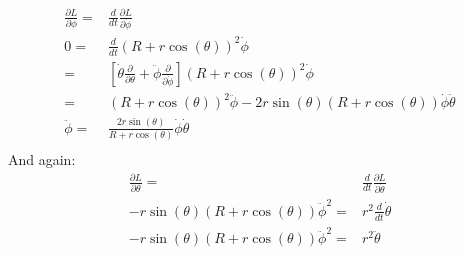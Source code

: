 \begin{equation*}
\begin{aligned}
	\frac{\partial L}{\partial \phi} =& \frac{d}{d t}\frac{\partial L}{\partial \dot{\phi}}\\	
	0 =& \frac{d}{d t}(R+r\cos(\theta))^2\dot{\phi} \\
	=& \left[\dot{\theta}\frac{\partial}{\partial \theta} + \ddot{\phi}\frac{\partial}{\partial \dot{\phi}}\right](R+r\cos(\theta))^2\dot{\phi} \\
	=& (R+r\cos(\theta))^2\ddot{\phi}-2r\sin(\theta)(R+r\cos(\theta))\dot{\phi}\dot{\theta} \\
	\ddot{\phi} =& \frac{2r\sin(\theta)}{R+r\cos(\theta)}\dot{\phi}\dot{\theta} \\
\end{aligned}
\end{equation*}
And again:
\begin{equation*}
\begin{aligned}
	\frac{\partial L}{\partial \theta} =& \frac{d}{d t}\frac{\partial L}{\partial \dot{\theta}}\\	
	-r\sin(\theta)(R+r\cos(\theta))\ddot{\phi}^2 =& r^2\frac{d}{dt}\dot{\theta} \\
	-r\sin(\theta)(R+r\cos(\theta))\ddot{\phi}^2 =& r^2\ddot{\theta} \\
\end{aligned}
\end{equation*}
